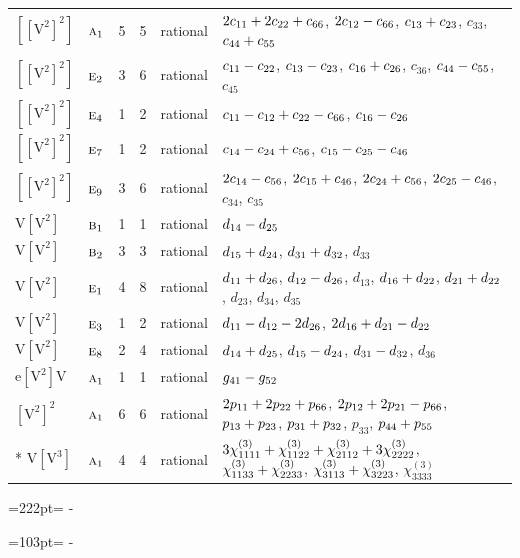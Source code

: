\documentclass[10pt,a4paper]{article}
\newcommand{\needspace}[1]{\par\penalty-100\begingroup\dimen0=#1\relax\dimen2=\pagegoal
  \advance\dimen2-\pagetotal\ifdim\dimen0>\dimen2\relax\ifdim\dimen2>0pt\vfil\break\fi\fi
  \endgroup}
\numberwithin{equation}{section}
\newcommand{\irr}[1]{\text{\normalfont\scshape #1}}
\newcommand{\jahn}[1]{\mathrm{#1}}
\newlength{\fillwidth}\newlength{\cellwidth}\newlength{\colwidth}
\newcommand{\signbreak}{\penalty100\relax}
\begin{document}
{\begin{longtable}{@{}llrrl>{\RaggedRight\arraybackslash}p{\fillwidth}@{}}
$\jahn{[[V^{2}]^{2}]}$ & $\irr{a}_{1}$ & 5 & 5 & rational & $2c_{11} +\signbreak 2c_{22} +\signbreak c_{66}$, $2c_{12} -\signbreak c_{66}$, $c_{13} +\signbreak c_{23}$, $c_{33}$, $c_{44} +\signbreak c_{55}$\\
$\jahn{[[V^{2}]^{2}]}$ & $\irr{e}_{2}$ & 3 & 6 & rational & $c_{11} -\signbreak c_{22}$, $c_{13} -\signbreak c_{23}$, $c_{16} +\signbreak c_{26}$, $c_{36}$, $c_{44} -\signbreak c_{55}$, $c_{45}$\\
$\jahn{[[V^{2}]^{2}]}$ & $\irr{e}_{4}$ & 1 & 2 & rational & $c_{11} -\signbreak c_{12} +\signbreak c_{22} -\signbreak c_{66}$, $c_{16} -\signbreak c_{26}$\\
$\jahn{[[V^{2}]^{2}]}$ & $\irr{e}_{7}$ & 1 & 2 & rational & $c_{14} -\signbreak c_{24} +\signbreak c_{56}$, $c_{15} -\signbreak c_{25} -\signbreak c_{46}$\\
$\jahn{[[V^{2}]^{2}]}$ & $\irr{e}_{9}$ & 3 & 6 & rational & $2c_{14} -\signbreak c_{56}$, $2c_{15} +\signbreak c_{46}$, $2c_{24} +\signbreak c_{56}$, $2c_{25} -\signbreak c_{46}$, $c_{34}$, $c_{35}$\\
$\jahn{V[V^{2}]}$ & $\irr{b}_{1}$ & 1 & 1 & rational & $d_{14} -\signbreak d_{25}$\\
$\jahn{V[V^{2}]}$ & $\irr{b}_{2}$ & 3 & 3 & rational & $d_{15} +\signbreak d_{24}$, $d_{31} +\signbreak d_{32}$, $d_{33}$\\
$\jahn{V[V^{2}]}$ & $\irr{e}_{1}$ & 4 & 8 & rational & $d_{11} +\signbreak d_{26}$, $d_{12} -\signbreak d_{26}$, $d_{13}$, $d_{16} +\signbreak d_{22}$, $d_{21} +\signbreak d_{22}$, $d_{23}$, $d_{34}$, $d_{35}$\\
$\jahn{V[V^{2}]}$ & $\irr{e}_{3}$ & 1 & 2 & rational & $d_{11} -\signbreak d_{12} -\signbreak 2d_{26}$, $2d_{16} +\signbreak d_{21} -\signbreak d_{22}$\\
$\jahn{V[V^{2}]}$ & $\irr{e}_{8}$ & 2 & 4 & rational & $d_{14} +\signbreak d_{25}$, $d_{15} -\signbreak d_{24}$, $d_{31} -\signbreak d_{32}$, $d_{36}$\\
$\jahn{e[V^{2}]V}$ & $\irr{a}_{1}$ & 1 & 1 & rational & $\mathnormal{g}_{41} -\signbreak \mathnormal{g}_{52}$\\
$\jahn{[V^{2}]^{2}}$ & $\irr{a}_{1}$ & 6 & 6 & rational & $2p_{11} +\signbreak 2p_{22} +\signbreak p_{66}$, $2p_{12} +\signbreak 2p_{21} -\signbreak p_{66}$, $p_{13} +\signbreak p_{23}$, $p_{31} +\signbreak p_{32}$, $p_{33}$, $p_{44} +\signbreak p_{55}$\\*
$\jahn{V[V^{3}]}$ & $\irr{a}_{1}$ & 4 & 4 & rational & $3\chi^{(3)}_{1111} +\signbreak \chi^{(3)}_{1122} +\signbreak \chi^{(3)}_{2112} +\signbreak 3\chi^{(3)}_{2222}$, $\chi^{(3)}_{1133} +\signbreak \chi^{(3)}_{2233}$, $\chi^{(3)}_{3113} +\signbreak \chi^{(3)}_{3223}$, $\chi^{(3)}_{3333}$\\
\bottomrule\end{longtable}}
\needspace{222pt}
\needspace{103pt}
\end{document}
